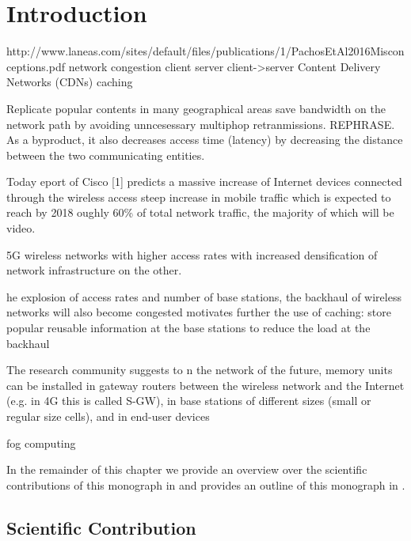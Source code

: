 \chapter{Introduction}\label{chap:introduction}
http://www.laneas.com/sites/default/files/publications/1/PachosEtAl2016Misconceptions.pdf
network congestion client server
client->server Content Delivery Networks (CDNs) caching

Replicate popular contents in many geographical areas
save bandwidth on the network path by avoiding unncesessary multiphop retranmissions.
REPHRASE. As a byproduct, it also decreases access time (latency) by decreasing the distance between the two communicating entities.

Today eport of Cisco [1] predicts a massive increase of Internet devices connected through the wireless
access
steep increase in mobile traffic which is expected to reach by 2018
oughly 60\% of total network traffic, the majority of which will be video.

5G wireless networks with higher access rates
with increased densification of network infrastructure on the other.

he explosion of access rates
and number of base stations, the backhaul of wireless networks will also become congested motivates further the use of caching: store popular reusable information at the base
stations to reduce the load at the backhaul

The research community suggests to
n the network of the future, memory units can be installed in gateway routers between
the wireless network and the Internet (e.g. in 4G this is called S-GW), in base stations of different
sizes (small or regular size cells), and in end-user devices

fog computing


In the remainder of this chapter we provide an overview over the scientific contributions of this monograph in  and provides an outline of this monograph in .



\section{Scientific Contribution}\label{sec:introduction:scientific_contribution}

